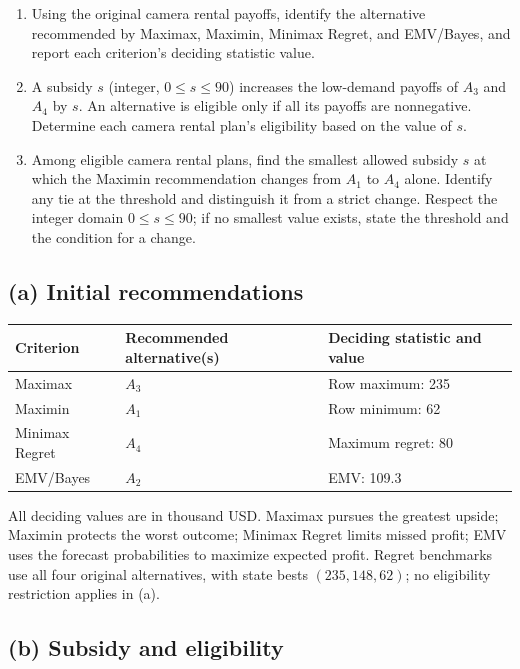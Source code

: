 \begin{enumerate}[label=\textbf{(\alph*)},leftmargin=*]
	\item Using the original camera rental payoffs, identify the alternative recommended by Maximax, Maximin, Minimax Regret, and EMV/Bayes, and report each criterion's deciding statistic value. 

	\item A subsidy $s$ (integer, $0\leq s\leq90$) increases the low-demand payoffs of $A_3$ and $A_4$ by $s$. An alternative is eligible only if all its payoffs are nonnegative. Determine each camera rental plan's eligibility based on the value of $s$. 

	\item Among eligible camera rental plans, find the smallest allowed subsidy $s$ at which the Maximin recommendation changes from $A_1$ to $A_4$ alone. Identify any tie at the threshold and distinguish it from a strict change. Respect the integer domain $0\leq s\leq90$; if no smallest value exists, state the threshold and the condition for a change. 
\end{enumerate}
\label{sol:q1a}
\subsection*{(a) Initial recommendations }
\begin{center}
\begin{tabular}{lll}\toprule
Criterion & Recommended alternative(s) & Deciding statistic and value\\ \midrule
		Maximax & $A_3$ & Row maximum: 235\\
		Maximin & $A_1$ & Row minimum: 62\\
		Minimax Regret & $A_4$ & Maximum regret: 80\\
		EMV/Bayes & $A_2$ & EMV: 109.3\\
		\bottomrule\end{tabular}
\end{center}
All deciding values are in thousand USD. Maximax pursues the greatest upside; Maximin protects the worst outcome; Minimax Regret limits missed profit; EMV uses the forecast probabilities to maximize expected profit. Regret benchmarks use all four original alternatives, with state bests $(235,148,62)$; no eligibility restriction applies in (a).
\secInicio[sec:q1]


\label{sol:q1b}
\subsection*{(b) Subsidy and eligibility }

